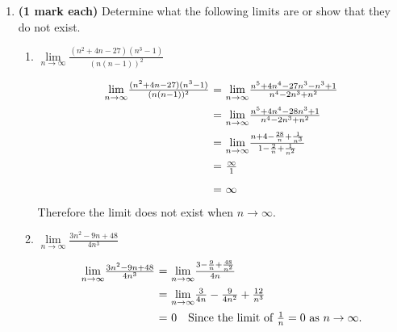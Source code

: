 \documentclass[12pt]{report}
\begin{document}
\begin{enumerate}[leftmargin=\labelsep]
    \item {\bf (1 mark each)} Determine what the following limits are or show that they do not exist.
        \begin{enumerate}
            \item $ {\lim \limits_{{n\rightarrow \infty}}} \frac{(n^2+4 n-27)(n^3-1)}{(n(n-1))^2} $
                \begin{tcolorbox}
                    \begin{equation*}
                        \begin{array}{r@{~=~}l}
                            {\lim \limits_{{n\rightarrow \infty}}} \frac{(n^2+4 n-27)(n^3-1)}{(n(n-1))^2} & {\lim \limits_{{n\rightarrow \infty}}} \frac{n^5+4n^4-27n^3-n^3+1}{n^4-2n^3+n^2} \\ [2ex]
                            & {\lim \limits_{{n\rightarrow \infty}}} \frac{n^5+4n^4-28n^3+1}{n^4-2n^3+n^2} \\ [2ex]
                            & {\lim \limits_{{n\rightarrow \infty}}} \frac{n+4-\frac{28}{n}+\frac{1}{n^3}}{1-\frac{2}{n}+\frac{1}{n^2}} \\ [2ex]
                            & \frac{\infty}{1} \\ [2ex]
                            & \infty
                        \end{array}
                    \end{equation*}
                    Therefore the limit does not exist when $n \rightarrow \infty$.
                \end{tcolorbox}
            \item $\lim \limits_{n\rightarrow \infty} \frac{3n^2-9n + 48}{4n^3}$
                \begin{tcolorbox}
                    \begin{equation*}
                        \begin{array}{r@{~=~}l}
                            {\lim \limits_{{n\rightarrow \infty}}} \frac{3n^2-9n + 48}{4n^3} & {\lim \limits_{{n\rightarrow \infty}}} \frac{3-\frac{9}{n} + \frac{48}{n^2}}{4n} \\ [2ex]
                            & {\lim \limits_{{n\rightarrow \infty}}} \frac{3}{4n} - \frac{9}{4n^2} + \frac{12}{n^3} \\ [2ex]
                            & 0 \quad \text{Since the limit of } \frac{1}{n} = 0 \text{ as } n \rightarrow \infty.
                        \end{array}
                    \end{equation*}

\end{tcolorbox}
\end{enumerate}
\end{enumerate}
\end{document}
